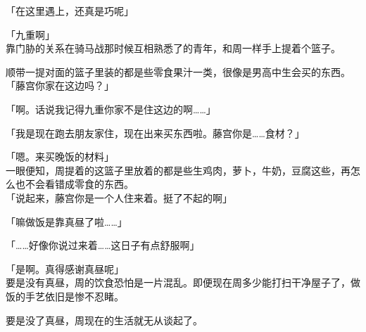 「在这里遇上，还真是巧呢」

「九重啊」\\

靠门胁的关系在骑马战那时候互相熟悉了的青年，和周一样手上提着个篮子。

顺带一提对面的篮子里装的都是些零食果汁一类，很像是男高中生会买的东西。\\

「藤宫你家在这边吗？」

「啊。话说我记得九重你家不是住这边的啊……」

「我是现在跑去朋友家住，现在出来买东西啦。藤宫你是……食材？」

「嗯。来买晚饭的材料」\\

一眼便知，周提着的这篮子里放着的都是些生鸡肉，萝卜，牛奶，豆腐这些，再怎么也不会看错成零食的东西。\\

「说起来，藤宫你是一个人住来着。挺了不起的啊」

「嘛做饭是靠真昼了啦……」

「……好像你说过来着……这日子有点舒服啊」

「是啊。真得感谢真昼呢」\\

要是没有真昼，周的饮食恐怕是一片混乱。即便现在周多少能打扫干净屋子了，做饭的手艺依旧是惨不忍睹。

要是没了真昼，周现在的生活就无从谈起了。\\

